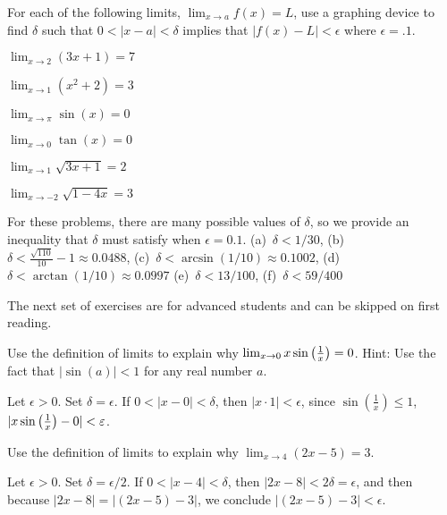 \begin{exercises}


\begin{exercise} 
For each of the following limits, $\lim_{x\to a} f(x) =L$, use a
graphing device to find $\delta$ such that $0<|x -a|<\delta$ implies
that $|f(x)-L|<\epsilon$ where $\epsilon = .1$.
\begin{enumerate}
\begin{multicols}{3}
\item $\lim_{x\to 2}(3x+1) = 7$  
\item $\lim_{x\to 1} (x^2+2) = 3$  
\item $\lim_{x\to \pi} \sin(x) = 0$  
\item $\lim_{x\to 0} \tan(x) = 0$
\item $\lim_{x\to 1} \sqrt{3x+1} = 2$
\item $\lim_{x\to -2} \sqrt{1-4x} = 3$
\end{multicols}  
\end{enumerate}
\begin{answer}
  For these problems, there are many possible values of $\delta$, so we provide an inequality that $\delta$ must satisfy when $\epsilon = 0.1$.\hspace{1em}
  (a)~$\delta < 1/30$,
  (b)~$\delta < \frac{\sqrt{110}}{10} - 1 \approx 0.0488$,
  (c)~$\delta < \arcsin \left( 1/10 \right) \approx 0.1002$,
  (d)~$\delta < \arctan \left( 1/10 \right) \approx 0.0997$
  (e)~$\delta < 13/100$,
  (f)~$\delta < 59/400$
\end{answer}
\end{exercise}

\noindent The next set of exercises are for advanced students and can be
skipped on first reading.

\begin{exercise} 
Use the definition of limits to explain why $\lim_{x\to 0 } x\sin
\left( {1\over x}\right) = 0$.  Hint: Use the fact that $|\sin(a) |< 1
$ for any real number $a$.
\begin{answer}
 Let $\epsilon >0$. Set $\delta = \epsilon$. If $0<|x-0| <\delta$,
 then $|x\cdot 1|<\epsilon$, since $\sin\left(\frac{1}{x}\right)\le
 1$, $|x\sin \left( {1\over x}\right)-0|< \epsilon$.
\end{answer}
\end{exercise}

\begin{exercise} 
Use the definition of limits to explain why $\lim_{x\to 4} (2x-5)
= 3$.
\begin{answer}
  Let $\epsilon > 0$.  Set $\delta = \epsilon/2$.  If $0 < |x - 4| < \delta$, then $|2x - 8| < 2 \delta = \epsilon$, and then because $|2x - 8| = |(2x - 5) - 3|$, we conclude $|(2x - 5) - 3| < \epsilon$.
\end{answer}
\end{exercise}


\end{exercises}
